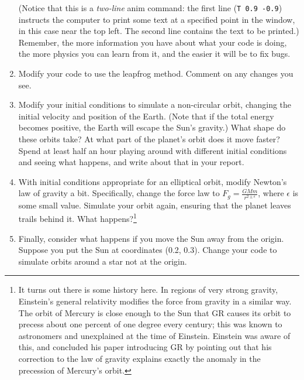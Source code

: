 \documentclass[12pt]{article}
\begin{document}
\begin{enumerate}
{	(Notice that this is a {\it two-line} anim command: the first line ({\tt T 0.9 -0.9}) instructs the computer to print some text at a specified point in the window,
	 in this case near the top left. The second line contains the text to be printed.) Remember, the more information you have about what your code is doing, the more
	  physics you can learn from it, and the easier it will be to fix bugs.

      }


\item{Modify your code to use the leapfrog method. Comment on any changes you see.}

\item{Modify your initial conditions to simulate a non-circular orbit, changing the initial velocity and position of the Earth. (Note that if the total energy becomes positive, the Earth will escape the Sun's gravity.) What shape do these orbits take? At what part of the planet's orbit does it move faster? Spend at 
  least half an hour playing around with different initial conditions and seeing
    what happens, and write about that in your report.}

    \item With initial conditions appropriate for an elliptical orbit, modify Newton's law of gravity a bit. Specifically, change the force law to $F_g = \frac{GMm}{r^{2 \pm \epsilon}}$, where $\epsilon$ is some small value. Simulate your orbit again, ensuring that the planet leaves trails behind it. What happens?\footnote{
      It turns out there is some history here. In regions of very strong gravity, Einstein's general relativity modifies the force from gravity in a similar way. The orbit of 
	Mercury is close enough to the Sun that GR causes its orbit to precess about one percent of one degree every century; this was known to astronomers and unexplained at the
	time of Einstein. Einstein was aware of this, and concluded his paper introducing GR by pointing out that his correction to the law of gravity explains exactly the 
	anomaly in the precession of Mercury's orbit.}



	\item{Finally, consider what happens if you move the Sun away from the origin. Suppose you put the Sun at coordinates (0.2, 0.3). Change your code to simulate orbits around a star not at the origin.}

	\end{enumerate}

	
\end{document}
